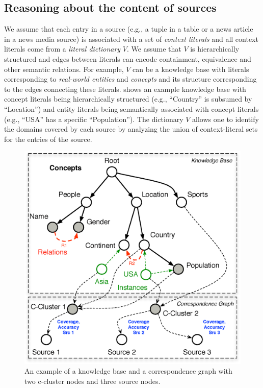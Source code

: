 \documentclass{vldb}
\begin{document}
\subsection{Reasoning about the content of sources}
\label{sec:reasoning}
We assume that each entry in a source (e.g., a tuple in a table or a news article in a news media source) is associated with a set of {\em context literals} and all context literals come from a {\em literal dictionary} $V$. We assume that $V$ is hierarchically structured and edges between literals can encode containment, equivalence and other semantic relations. For example, $V$ can be a knowledge base with literals corresponding to {\em real-world entities} and {\em concepts} and its structure corresponding to the edges connecting these literals.  shows an example knowledge base with concept literals being hierarchically structured (e.g., ``Country'' is subsumed by ``Location'') and entity literals being semantically associated with concept literals (e.g., ``USA'' has a specific ``Population''). The dictionary $V$ allows one to identify the domains covered by each source by analyzing the union of context-literal sets for the entries of the source. 

\begin{figure}[h]
	\begin{center}
	\includegraphics[clip,scale=0.28]{fig/kgcg}
	\vspace{-10pt}
	\caption{An example of a knowledge base and a correspondence graph with two c-cluster nodes and three source nodes.}
	\label{fig:kgcg}
	\vspace{-15pt}
	\end{center}
\end{figure}
\end{document}
